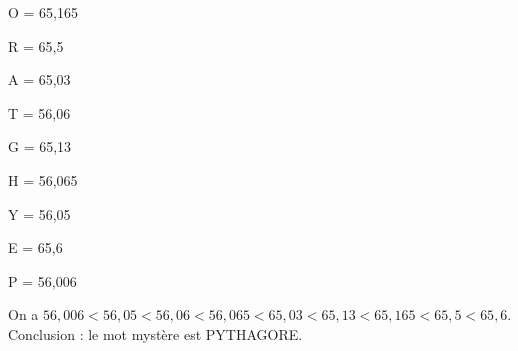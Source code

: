    \begin{colitemize}{3}
      \item \blue O = 65,165 \smallskip
      \item \blue R = 65,5 \smallskip
      \item \blue A = 65,03 \medskip
      \item \blue T = 56,06
      \item \blue G = 65,13
      \item \blue H = 56,065
      \item \blue Y = 56,05
      \item \blue E = 65,6
      \item \blue P = 56,006
   \end{colitemize}
   On a {\blue $56,006 < 56,05 < 56,06 < 56,065 < 65,03 < 65,13 < 65,165 < 65,5 < 65,6$}. \\
   Conclusion : le mot mystère est \blue PYTHAGORE. \\
